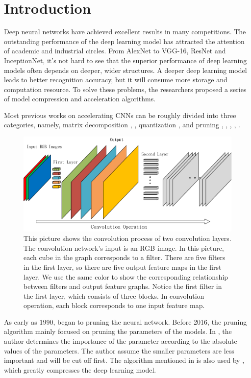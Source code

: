 \documentclass[runningheads]{llncs}
\begin{document}
\section{Introduction}
Deep neural networks have achieved excellent results in many competitions. The outstanding performance of the deep learning model has attracted the attention of academic and industrial circles. From AlexNet\cite{b1} to VGG-16\cite{b2}, ResNet\cite{b3} and InceptionNet\cite{b4}, it's not hard to see that the superior performance of deep learning models often depends on deeper, wider structures. A deeper deep learning model leads to better recognition accuracy, but it will consume more storage and computation resource. To solve these problems, the researchers proposed a series of model compression and acceleration algorithms.

Most previous works on accelerating CNNs can be roughly divided into three categories, namely, matrix decomposition \cite{b5}, \cite{b6}, quantization \cite{b7}, \cite{b8} and pruning \cite{b9}, \cite{b11}, \cite{b27}, \cite{b28}, \cite{b30}.


\begin{figure}
\centering
\includegraphics[width=.5\textwidth]{convolution_operation.pdf}
\caption{This picture shows the convolution process of two convolution layers. The convolution network's input is an RGB image. In this picture, each cube in the graph corresponds to a filter. There are five filters in the first layer, so there are five output feature maps in the first layer. We use the same color to show the corresponding relationship between filters and output feature graphs. Notice the first filter in the first layer, which consists of three blocks. In convolution operation, each block corresponds to one input feature map.}
\label{fig:convolution_operation}
\end{figure}

As early as 1990, \cite{b23} began to pruning the neural network. Before 2016, the pruning algorithm mainly focused on pruning the parameters of the models. In \cite{b9}, the author determines the importance of the parameter according to the absolute values of the parameters. The author assume the smaller parameters are less important and will be cut off first. The algorithm mentioned in \cite{b9} is also used by \cite{b10}, which greatly compresses the deep learning model.
\end{document}

